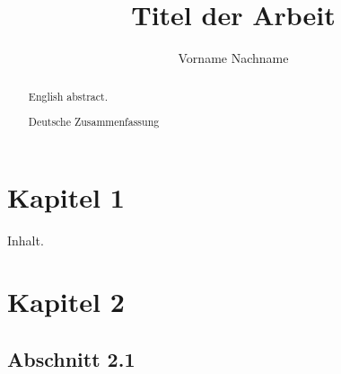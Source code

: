 \documentclass[ngerman,USenglish]{tudscrreprt}
\title{Titel der Arbeit}
\author{Vorname Nachname}
\begin{document}
\maketitle

\begin{abstract}
   English abstract.
   
   \nextabstract[ngerman]
   Deutsche Zusammenfassung
\end{abstract}

\tableofcontents
\chapter{Kapitel 1}
Inhalt.

\chapter{Kapitel 2}
\section{Abschnitt 2.1}
\end{document}
